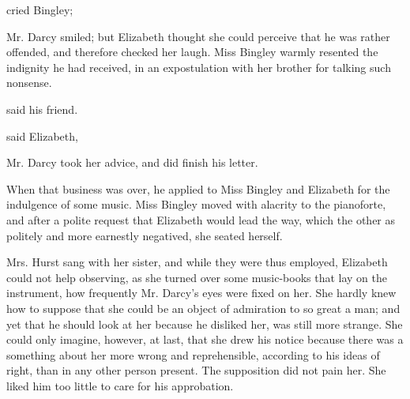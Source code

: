 
 cried Bingley; 

Mr. Darcy smiled; but Elizabeth thought she could perceive that he was rather offended, and therefore checked her laugh. Miss Bingley warmly resented the indignity he had received, in an expostulation with her brother for talking such nonsense.

 said his friend. 


 said Elizabeth, 

Mr. Darcy took her advice, and did finish his letter.

When that business was over, he applied to Miss Bingley and Elizabeth for the indulgence of some music. Miss Bingley moved with alacrity to the pianoforte, and after a polite request that Elizabeth would lead the way, which the other as politely and more earnestly negatived, she seated herself.

Mrs. Hurst sang with her sister, and while they were thus employed, Elizabeth could not help observing, as she turned over some music-books that lay on the instrument, how frequently Mr. Darcy's eyes were fixed on her. She hardly knew how to suppose that she could be an object of admiration to so great a man; and yet that he should look at her because he disliked her, was still more strange. She could only imagine, however, at last, that she drew his notice because there was a something about her more wrong and reprehensible, according to his ideas of right, than in any other person present. The supposition did not pain her. She liked him too little to care for his approbation.

